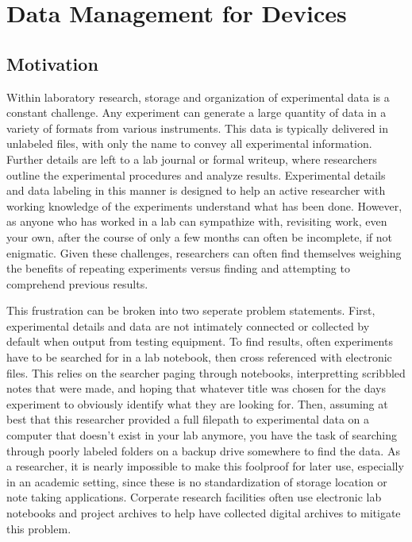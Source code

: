\documentclass[../thesis.tex]{subfiles}
\begin{document}
\chapter{Data Management for Devices}\label{sec:data}


\section{Motivation}


Within laboratory research, storage and organization of experimental data is a constant challenge.
Any experiment can generate a large quantity of data in a variety of formats from various instruments.
This data is typically delivered in unlabeled files, with only the name to convey all experimental information.
Further details are left to a lab journal or formal writeup, where researchers outline the experimental procedures and analyze results.
Experimental details and data labeling in this manner is designed to help an active researcher with working knowledge of the experiments understand what has been done.
However, as anyone who has worked in a lab can sympathize with, revisiting work, even your own, after the course of only a few months can often be incomplete, if not enigmatic.
Given these challenges, researchers can often find themselves weighing the benefits of repeating experiments versus finding and attempting to comprehend previous results.

This frustration can be broken into two seperate problem statements.
First, experimental details and data are not intimately connected or collected by default when output from testing equipment.
To find results, often experiments have to be searched for in a lab notebook, then cross referenced with electronic files.  
This relies on the searcher paging through notebooks, interpretting scribbled notes that were made, and hoping that whatever title was chosen for the days experiment to obviously identify what they are looking for.
Then, assuming at best that this researcher provided a full filepath to experimental data on a computer that doesn't exist in your lab anymore, you have the task of searching through poorly labeled folders on a backup drive somewhere to find the data.
As a researcher, it is nearly impossible to make this foolproof for later use, especially in an academic setting, since these is no standardization of storage location or note taking applications.
Corperate research facilities often use electronic lab notebooks and project archives to help have collected digital archives to mitigate this problem. 
\end{document}
